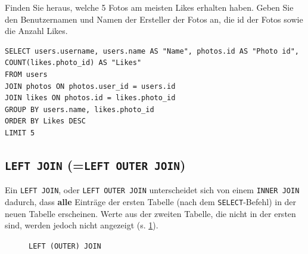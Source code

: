 \begin{mychallenge}
  Finden Sie heraus, welche 5 Fotos am meisten Likes erhalten haben. Geben Sie den Benutzernamen und Namen der Ersteller der Fotos an, die id der Fotos sowie die Anzahl Likes.
  \begin{myanswer}
    \begin{lstlisting}[style=sql]
SELECT users.username, users.name AS "Name", photos.id AS "Photo id", COUNT(likes.photo_id) AS "Likes"
FROM users
JOIN photos ON photos.user_id = users.id
JOIN likes ON photos.id = likes.photo_id
GROUP BY users.name, likes.photo_id
ORDER BY Likes DESC
LIMIT 5
\end{lstlisting}
  \end{myanswer}

\end{mychallenge}

\subsection{\texorpdfstring{\lstinline[style=sql]|LEFT JOIN| (=\lstinline[style=sql]|LEFT OUTER JOIN|)}{LEFT JOIN (=LEFT OUTER JOIN)}}
Ein \lstinline[style=sql]|LEFT JOIN|, oder \lstinline[style=sql]|LEFT OUTER JOIN| unterscheidet sich von einem \lstinline[style=sql]|INNER JOIN| dadurch, dass \textbf{alle} Einträge der ersten Tabelle (nach dem \lstinline[style=sql]|SELECT|-Befehl) in der neuen Tabelle erscheinen. Werte aus der zweiten Tabelle, die nicht in der ersten sind, werden jedoch nicht angezeigt (s. \cref{fig:venn-left-join}).

\begin{figure}[H]
  \centering
  \caption{\lstinline[style=sql]|LEFT (OUTER) JOIN|}
  \label{fig:venn-left-join}
\end{figure}


